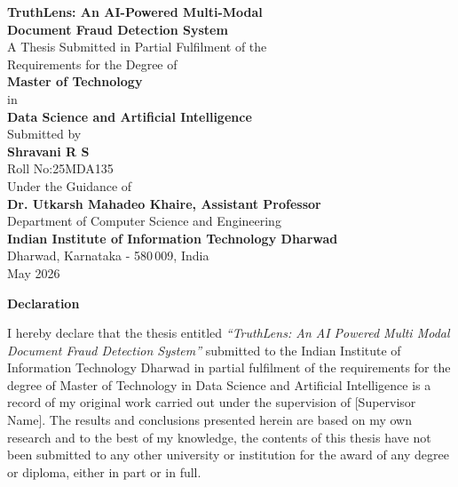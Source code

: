 \documentclass[12pt,a4paper,oneside]{report}
\begin{document}
\begin{titlepage}
\centering\vspace*{0.5cm}
{\LARGE\bfseries TruthLens: An AI-Powered Multi-Modal\\[8pt]
 Document Fraud Detection System}\\[1.2cm]
{\large A Thesis Submitted in Partial Fulfilment of the\\[4pt]
 Requirements for the Degree of}\\[0.7cm]
{\Large\bfseries Master of Technology}\\[4pt]{\large in}\\[4pt]
{\Large\bfseries Data Science and Artificial Intelligence}\\[1.2cm]
{\large Submitted by}\\[0.4cm]
{\Large\bfseries Shravani R S}\\[0.2cm]
{\large Roll No:\quad25MDA135}\\[1.0cm]
{\large Under the Guidance of}\\[0.3cm]
{\large\bfseries Dr. Utkarsh Mahadeo Khaire, Assistant Professor}\\[0.2cm]
{\large Department of Computer Science and Engineering}\\[1.0cm]
{\large\bfseries Indian Institute of Information Technology Dharwad}\\[0.2cm]
{\large Dharwad, Karnataka - 580\,009, India}\\[0.8cm]
{\large May 2026}
\end{titlepage}

\newpage\thispagestyle{plain}
\begin{center}{\Large\bfseries Declaration}\end{center}\vspace{0.8cm}
\noindent I hereby declare that the thesis entitled \textit{``TruthLens:
An AI Powered Multi Modal Document Fraud Detection System''} submitted to the
Indian Institute of Information Technology Dharwad in partial fulfilment of
the requirements for the degree of Master of Technology in Data Science and
Artificial Intelligence is a record of my original work carried out under the
supervision of [Supervisor Name]. The results and conclusions presented herein
are based on my own research and to the best of my knowledge, the contents of
this thesis have not been submitted to any other university or institution for
the award of any degree or diploma, either in part or in full.
\end{document}
